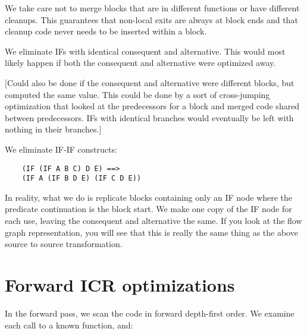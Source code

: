 We take care not to merge blocks that are in different functions or have
different cleanups.  This guarantees that non-local exits are always at block
ends and that cleanup code never needs to be inserted within a block.

We eliminate IFs with identical consequent and alternative.  This would most
likely happen if both the consequent and alternative were optimized away.

[Could also be done if the consequent and alternative were different blocks,
but computed the same value.  This could be done by a sort of cross-jumping
optimization that looked at the predecessors for a block and merged code shared
between predecessors.  IFs with identical branches would eventually be left
with nothing in their branches.]

We eliminate IF-IF constructs:

\begin{verbatim}
    (IF (IF A B C) D E) ==>
    (IF A (IF B D E) (IF C D E))
\end{verbatim}

In reality, what we do is replicate blocks containing only an IF node where the
predicate continuation is the block start.  We make one copy of the IF node for
each use, leaving the consequent and alternative the same.  If you look at the
flow graph representation, you will see that this is really the same thing as
the above source to source transformation.


\section{Forward ICR optimizations}

In the forward pass, we scan the code in forward depth-first order.  We
examine each call to a known function, and:

